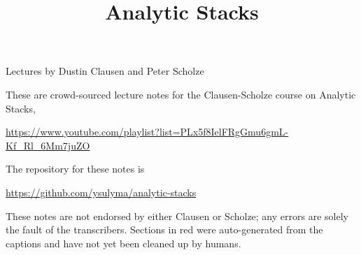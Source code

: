 \documentclass[reqno]{amsart}
\title{Analytic Stacks}
\begin{document}
\maketitle
\begin{center}
  Lectures by Dustin Clausen and Peter Scholze
\end{center}

\tableofcontents

These are crowd-sourced lecture notes for the Clausen-Scholze course on Analytic Stacks,
\begin{center}
  \url{https://www.youtube.com/playlist?list=PLx5f8IelFRgGmu6gmL-Kf_Rl_6Mm7juZO}
\end{center}

The repository for these notes is
\begin{center}
  \url{https://github.com/ysulyma/analytic-stacks}
\end{center}

These notes are not endorsed by either Clausen or Scholze; any errors are solely the fault of the transcribers. Sections in red were auto-generated from the captions and have not yet been cleaned up by humans.




























\end{document}
